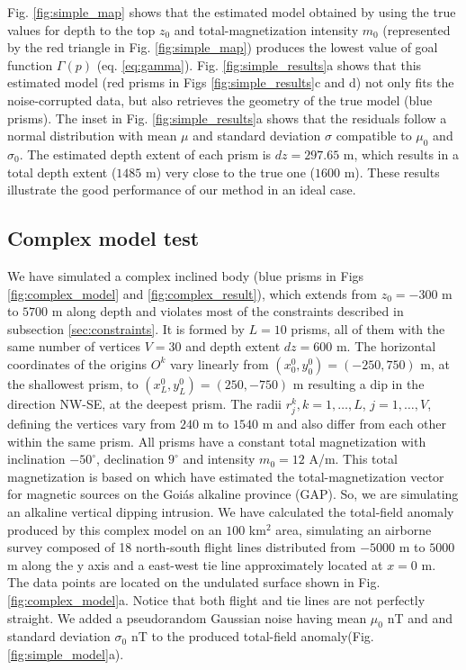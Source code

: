 Fig. \ref{fig:simple_map} shows that the estimated model obtained by using the true values for depth to the top $ z_0 $ and total-magnetization intensity $ m_0 $ (represented by the red triangle in Fig. \ref{fig:simple_map}) produces the lowest value of goal function  $ \Gamma(p) $ (eq. \ref{eq:gamma}). Fig. \ref{fig:simple_results}a shows that this estimated model (red prisms in Figs \ref{fig:simple_results}c and d) not only fits the noise-corrupted data, but also retrieves the geometry of the true model (blue prisms). The inset in Fig. \ref{fig:simple_results}a shows that the residuals follow a normal distribution with mean $ \mu $ and standard deviation $ \sigma $ compatible to $ \mu_0 $ and $ \sigma_0 $. The estimated depth extent of each prism is $ dz = 297.65 $ m, which results in a total depth extent ($ 1485$ m) very close to the true one ($ 1600 $ m). These results illustrate the good performance of our method in an ideal case.

\subsection{Complex model test}

We have simulated a complex inclined body (blue prisms in Figs \ref{fig:complex_model} and \ref{fig:complex_result}), which extends from $z_0=-300$ m to $5700$ m along depth and violates most of the constraints described in subsection \ref{sec:constraints}. It is formed by $ L = 10 $ prisms, all of them with the same number of vertices $ V = 30 $ and depth extent $ dz = 600 $ m. The horizontal coordinates of the origins $ O^k $ vary linearly from $ (x_0^0, y_0^0) = (-250, 750) $ m, at the shallowest prism, to $ (x_L^0, y_L^0) = (250, -750) $ m resulting a dip in the direction NW-SE, at the deepest prism. The radii $ r^k_j, k = 1, \dots, L$, $j = 1,\dots, V$, defining the vertices vary from $ 240 $ m to $ 1540 $ m and also differ from each other within the same prism. All prisms have a constant total magnetization with inclination $ -50^\circ $, declination $ 9^\circ $ and intensity $ m_0 = 12 $ A/m. This total magnetization is based on \cite{zhang-2018} which have estimated the total-magnetization vector for magnetic sources on the Goiás alkaline province (GAP). So, we are simulating an alkaline vertical dipping intrusion. We have calculated the total-field anomaly produced by this complex model on an $ 100 $ km$^2 $ area, simulating an airborne survey composed of 18 north-south flight lines distributed from $ -5000 $ m to $ 5000 $ m along the y axis and a east-west tie line approximately located at $ x = 0 $ m. The data points are located on the undulated surface shown in Fig. \ref{fig:complex_model}a. Notice that both flight and tie lines are not perfectly straight. We added a pseudorandom Gaussian noise having mean $ \mu_0$ nT and and standard deviation $ \sigma_0$ nT to the produced total-field anomaly(Fig. \ref{fig:simple_model}a).

